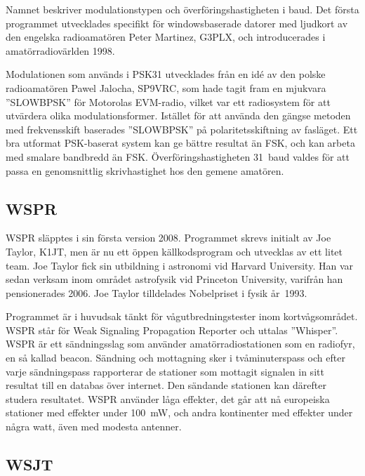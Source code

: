 \begin{historiabox}
Namnet beskriver modulationstypen och överföringshastigheten i baud.
Det första programmet utvecklades specifikt för windowsbaserade datorer med
ljudkort av den engelska radioamatören Peter Martinez, G3PLX, och
introducerades i amatörradiovärlden 1998.
\end{historiabox}

Modulationen som används i PSK31 utvecklades från en idé av den polske
radioamatören Pawel Jalocha, SP9VRC, som hade tagit fram en mjukvara
''SLOWBPSK'' för Motorolas EVM-radio, vilket var ett radiosystem för att
utvärdera olika modulationsformer.
Istället för att använda den gängse metoden med frekvensskift baserades
''SLOWBPSK'' på polaritetsskiftning av fasläget.
Ett bra utformat PSK-baserat system kan ge bättre resultat än FSK, och kan
arbeta med smalare bandbredd än FSK.
Överföringshastigheten 31~baud valdes för att passa en genomsnittlig
skrivhastighet hos den gemene amatören.

\subsection{WSPR}

\begin{historiabox}
WSPR släpptes i sin första version 2008.
Programmet skrevs initialt av Joe Taylor, K1JT, men är nu ett öppen
källkodsprogram och utvecklas av ett litet team.
Joe Taylor fick sin utbildning i astronomi vid Harvard University.
Han var sedan verksam inom området astrofysik vid Princeton University,
varifrån han pensionerades 2006.
Joe Taylor tilldelades Nobelpriset i fysik år~1993.
\end{historiabox}

Programmet är i huvudsak tänkt för vågutbredningstester inom kortvågsområdet.
WSPR står för Weak Signaling Propagation Reporter och uttalas ''Whisper''.
WSPR är ett sändningsslag som använder amatörradiostationen som en radiofyr, en
så kallad beacon.
Sändning och mottagning sker i tvåminuterspass och efter varje sändningspass
rapporterar de stationer som mottagit signalen in sitt resultat till en databas
över internet.
Den sändande stationen kan därefter studera resultatet.
WSPR använder låga effekter, det går att nå europeiska stationer med effekter
under \qty{100}{\milli\watt}, och andra kontinenter med effekter under några
watt, även med modesta antenner.

\subsection{WSJT}

